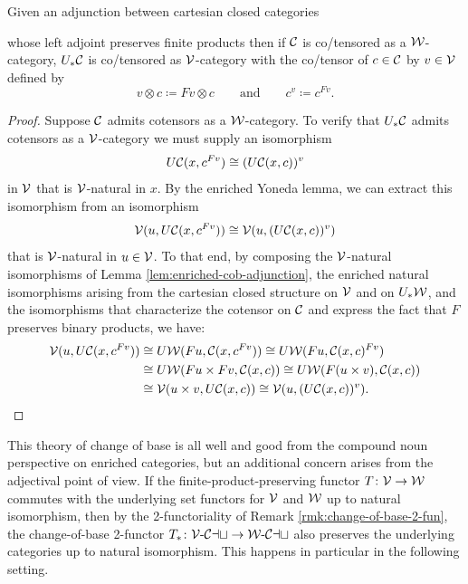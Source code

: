 \begin{proposition}\label{prop:cob-adjunction}
Given an adjunction between cartesian closed categories
\begin{center}
\end{center}
whose left adjoint preserves finite products then if ${\mathord{\mathcal{C}}}$ is co/tensored as a ${\mathord{\mathcal{W}}}$-cat\-e\-gory,  $U_*{\mathord{\mathcal{C}}}$ is co/tensored as ${\mathord{\mathcal{V}}}$-category with the co/tensor of $c \in {\mathord{\mathcal{C}}}$ by $v \in {\mathord{\mathcal{V}}}$ defined by
\[ v \otimes c \coloneq Fv \otimes c \qquad \text{and} \qquad c^v \coloneq c^{Fv}.\]
\end{proposition}
\begin{proof}
Suppose ${\mathord{\mathcal{C}}}$ admits cotensors as a ${\mathord{\mathcal{W}}}$-category. To verify that $U_*{\mathord{\mathcal{C}}}$ admits cotensors as a ${\mathord{\mathcal{V}}}$-category we must supply an isomorphism
\[ U{\mathord{\mathcal{C}}}(x,c^{Fv}) \cong (U{\mathord{\mathcal{C}}}(x,c))^v\] in ${\mathord{\mathcal{V}}}$ that is ${\mathord{\mathcal{V}}}$-natural in $x$. By the enriched Yoneda lemma, we can extract this isomorphism from an isomorphism \[ {\mathord{\mathcal{V}}}(u,U{\mathord{\mathcal{C}}}(x,c^{Fv})) \cong {\mathord{\mathcal{V}}}(u,(U{\mathord{\mathcal{C}}}(x,c))^v)\] that is ${\mathord{\mathcal{V}}}$-natural in $u \in {\mathord{\mathcal{V}}}$. To that end, by composing the ${\mathord{\mathcal{V}}}$-natural isomorphisms of Lemma \ref{lem:enriched-cob-adjunction}, the enriched natural isomorphisms arising from the cartesian closed structure on ${\mathord{\mathcal{V}}}$ and on $U_*{\mathord{\mathcal{W}}}$, and the isomorphisms that characterize the cotensor on ${\mathord{\mathcal{C}}}$ and express the fact that $F$ preserves binary products, we have:
\begin{align*} {\mathord{\mathcal{V}}}(u,U{\mathord{\mathcal{C}}}(x,c^{Fv})) &\cong U{\mathord{\mathcal{W}}}(Fu, {\mathord{\mathcal{C}}}(x,c^{Fv})) \cong U{\mathord{\mathcal{W}}}(Fu, {\mathord{\mathcal{C}}}(x,c)^{Fv}) \\ &\cong U{\mathord{\mathcal{W}}}(Fu \times Fv, {\mathord{\mathcal{C}}}(x,c))  \cong U{\mathord{\mathcal{W}}}(F(u \times v), {\mathord{\mathcal{C}}}(x,c)) \\ &\cong {\mathord{\mathcal{V}}}(u \times v, U{\mathord{\mathcal{C}}}(x,c)) \cong {\mathord{\mathcal{V}}}(u, (U{\mathord{\mathcal{C}}}(x,c))^v). \qedhere\end{align*}
\end{proof}



This theory of change of base is all well and good from the compound noun perspective on enriched categories, but an additional concern arises from the adjectival point of view. If the finite-product-preserving functor $T \colon {\mathord{\mathcal{V}}} \to {\mathord{\mathcal{W}}}$ commutes with the underlying set functors for ${\mathord{\mathcal{V}}}$ and ${\mathord{\mathcal{W}}}$ up to natural isomorphism, then by the 2-functoriality of Remark \ref{rmk:change-of-base-2-fun}, the change-of-base 2-functor $T_* \colon {{\mathord{\mathcal{V}}}}\text{-}{\mathord{\mathcal{Cat}}} \to {{\mathord{\mathcal{W}}}}\text{-}{\mathord{\mathcal{Cat}}}$ also preserves the underlying categories up to natural isomorphism. This happens in particular in the following setting.

